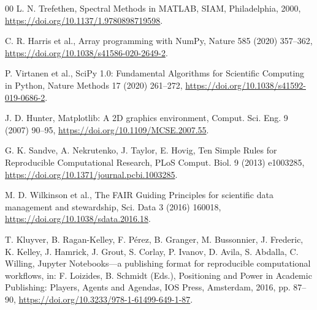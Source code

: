 \documentclass[a4paper,fleqn]{cas-dc}
\begin{document}
\begin{thebibliography}{00}
 L. N. Trefethen, Spectral Methods in MATLAB, SIAM, Philadelphia, 2000, \url{https://doi.org/10.1137/1.9780898719598}.

 C. R. Harris et al., Array programming with NumPy, Nature 585 (2020) 357--362, \url{https://doi.org/10.1038/s41586-020-2649-2}.

 P. Virtanen et al., SciPy 1.0: Fundamental Algorithms for Scientific Computing in Python, Nature Methods 17 (2020) 261--272, \url{https://doi.org/10.1038/s41592-019-0686-2}.

 J. D. Hunter, Matplotlib: A 2D graphics environment, Comput. Sci. Eng. 9 (2007) 90--95, \url{https://doi.org/10.1109/MCSE.2007.55}.

 G. K. Sandve, A. Nekrutenko, J. Taylor, E. Hovig, Ten Simple Rules for Reproducible Computational Research, PLoS Comput. Biol. 9 (2013) e1003285, \url{https://doi.org/10.1371/journal.pcbi.1003285}.

 M. D. Wilkinson et al., The FAIR Guiding Principles for scientific data management and stewardship, Sci. Data 3 (2016) 160018, \url{https://doi.org/10.1038/sdata.2016.18}.

 T. Kluyver, B. Ragan-Kelley, F. P\'erez, B. Granger, M. Bussonnier, J. Frederic, K. Kelley, J. Hamrick, J. Grout, S. Corlay, P. Ivanov, D. Avila, S. Abdalla, C. Willing, Jupyter Notebooks---a publishing format for reproducible computational workflows, in: F. Loizides, B. Schmidt (Eds.), Positioning and Power in Academic Publishing: Players, Agents and Agendas, IOS Press, Amsterdam, 2016, pp. 87--90, \url{https://doi.org/10.3233/978-1-61499-649-1-87}.

\end{thebibliography}
\end{document}
